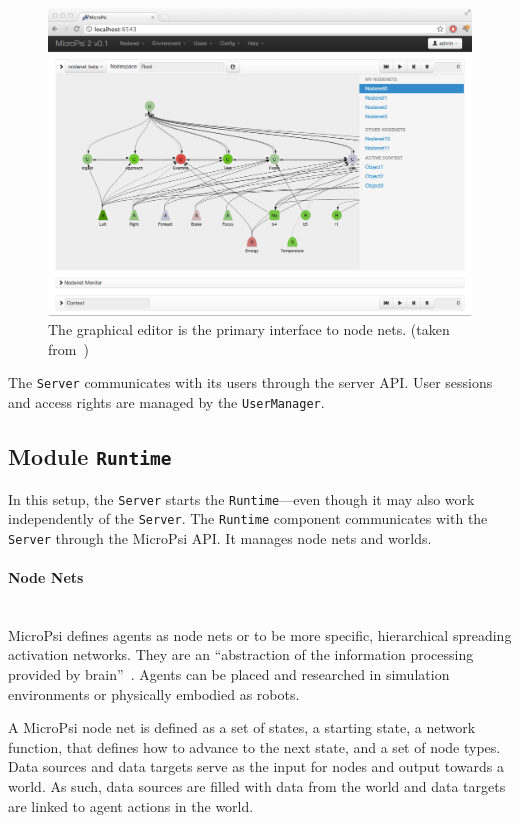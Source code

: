\begin{figure}[h]
  \centering
    \includegraphics[width=13cm]{graphics/micropsi2_nodenet}
  \caption[The graphical node net editor]{The graphical editor is the primary interface to node nets. (taken from~\cite{conf/agi/Bach12})}
  \label{micropsi2_nodenet}
\end{figure}

The \texttt{Server} communicates with its users through the server API. User sessions and access rights are managed by the \texttt{UserManager}.
   
        \subsection{Module \texttt{Runtime}}
In this setup, the \texttt{Server} starts the \texttt{Runtime}---even though it may also work independently of the \texttt{Server}. The \texttt{Runtime} component communicates with the \texttt{Server} through the MicroPsi API. It manages node nets and worlds.

        \paragraph{Node Nets}$\;$ \\
MicroPsi defines agents as node nets or to be more specific, hierarchical spreading activation networks. They are an ``abstraction of the information processing provided by brain''~\cite{conf/agi/Bach12}. Agents can be placed and researched in simulation environments or physically embodied as robots. 
  
A MicroPsi node net is defined as a set of states, a starting state, a network function, that defines how to advance to the next state, and a set of node types. Data sources and data targets serve as the input for nodes and output towards a world. As such, data sources are filled with data from the world and data targets are linked to agent actions in the world.


